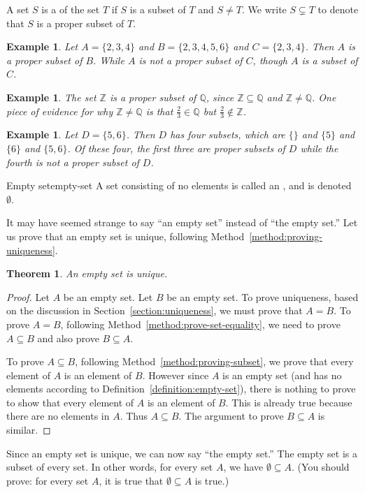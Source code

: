 \documentclass{book}
\newcounter{ekcounter}%
\theoremstyle{ekimcustom}
\newtheorem{theorem}[ekcounter]{Theorem}
\newtheorem{example}[ekcounter]{Example}
\newcommand\defn[1]{{\color{blue}{\bf #1}}}
\begin{document}
\begin{bdefinition}{}{}
A set $S$ is a \defn{proper subset} of the set $T$ if $S$ is a subset of $T$ and $S \not= T$. We write $S \subsetneq T$ to denote that $S$ is a proper subset of $T$.
\end{bdefinition}
\begin{example}
Let $A = \{2,3,4\}$ and $B = \{2,3,4,5,6\}$ and $C=\{2,3,4\}$. Then $A$ is a proper subset of $B$. While $A$ is not a proper subset of $C$, though $A$ is a subset of $C$.
\end{example}
\begin{example}
The set $\mathbb{Z}$ is a proper subset of $\mathbb{Q}$, since $\mathbb{Z} \subseteq \mathbb{Q}$ and $\mathbb{Z} \not= \mathbb{Q}$. One piece of evidence for why $\mathbb{Z} \not= \mathbb{Q}$ is that $\frac23 \in \mathbb{Q}$ but $\frac23 \not\in \mathbb{Z}$.
\end{example}

\begin{example}
Let $D = \{5,6\}$. Then $D$ has four subsets, which are $\{\}$ and $\{5\}$ and $\{6\}$ and $\{5,6\}$. Of these four, the first three are proper subsets of $D$ while the fourth is not a proper subset of $D$.
\end{example}

\begin{bdefinition}{Empty set}{empty-set}
A set consisting of no elements is called an \defn{empty set}, and is denoted $\emptyset$.
\end{bdefinition}
It may have seemed strange to say ``an empty set'' instead of ``the empty set.'' Let us prove that an empty set is unique, following Method~\ref{method:proving-uniqueness}.
\begin{theorem}
An empty set is unique.
\end{theorem}
\begin{proof}
Let $A$ be an empty set. Let $B$ be an empty set. To prove uniqueness, based on the discussion in Section~\ref{section:uniqueness}, we must prove that $A=B$. To prove $A=B$, following Method~\ref{method:prove-set-equality}, we need to prove $A \subseteq B$ and also prove $B \subseteq A$.

To prove $A \subseteq B$, following Method~\ref{method:proving-subset}, we prove that every element of $A$ is an element of $B$. However since $A$ is an empty set (and has no elements according to Definition~\ref{definition:empty-set}), there is nothing to prove to show that every element of $A$ is an element of $B$. This is already true because there are no elements in $A$. Thus $A \subseteq B$. The argument to prove $B \subseteq A$ is similar.
\end{proof}
Since an empty set is unique, we can now say ``the empty set.'' The empty set is a subset of every set. In other words, for every set $A$, we have $\emptyset \subseteq A$. (You should prove: for every set $A$, it is true that $\emptyset \subseteq A$ is true.)
\end{document}
